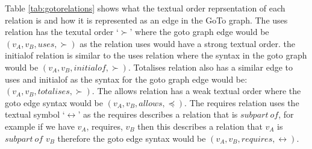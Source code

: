 Table \ref{tab:gotorelations} shows what the textual order reprsentation of each relation is and how it is represented as an edge in the GoTo graph. The uses relation has the texutal order `$\succ$' where the goto graph edge would be $(v_{A}, v_{B}, uses, \succ)$ as the relation uses would have a strong textual order. the initialof relation is similar to the uses relation where the syntax in the goto graph would be $(v_{A}, v_{B}, initialof, \succ)$. Totalises relation also has a similar edge to uses and initialof as the syntax for the goto graph edge would be: $(v_{A}, v_{B}, totalises, \succ)$. The allows relation has a weak textual order where the goto edge syntax would be $(v_{A}, v_{B}, allows, \preceq)$. The requires relation uses the textual symbol `$\leftrightarrow$' as the requires describes a relation that is $subpart\ of$, for example if we have $v_{A}$, requires, $v_{B}$ then this describes a relation that $v_{A}$ is $subpart\ of$ $v_{B}$ therefore the goto edge syntax would be $(v_{A}, v_{B}, requires, \leftrightarrow)$.

